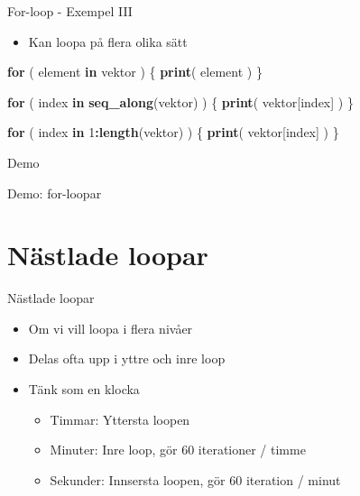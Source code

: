 \documentclass[
  11pt,
  ignorenonframetext,
]{beamer}
\newenvironment{Shaded}{\begin{snugshade}}{\end{snugshade}}
\newcommand{\ControlFlowTok}[1]{\textcolor[rgb]{0.13,0.29,0.53}{\textbf{#1}}}
\newcommand{\DecValTok}[1]{\textcolor[rgb]{0.00,0.00,0.81}{#1}}
\newcommand{\FunctionTok}[1]{\textcolor[rgb]{0.13,0.29,0.53}{\textbf{#1}}}
\newcommand{\NormalTok}[1]{#1}
\newcommand{\SpecialCharTok}[1]{\textcolor[rgb]{0.81,0.36,0.00}{\textbf{#1}}}
\providecommand{\tightlist}{%
  \setlength{\itemsep}{0pt}\setlength{\parskip}{0pt}}
\begin{document}
\begin{frame}[fragile]{For-loop - Exempel III}
\label{for-loop---exempel-iii}
\begin{itemize}
\tightlist
\item
  Kan loopa på flera olika sätt
\end{itemize}

\begin{Shaded}
\begin{Highlighting}[]
\ControlFlowTok{for}\NormalTok{ ( element }\ControlFlowTok{in}\NormalTok{ vektor ) \{}
  \FunctionTok{print}\NormalTok{( element )}
\NormalTok{\}}
\end{Highlighting}
\end{Shaded}

\begin{Shaded}
\begin{Highlighting}[]
\ControlFlowTok{for}\NormalTok{ ( index }\ControlFlowTok{in} \FunctionTok{seq\_along}\NormalTok{(vektor) ) \{}
  \FunctionTok{print}\NormalTok{( vektor[index] )}
\NormalTok{\}}
\end{Highlighting}
\end{Shaded}

\begin{Shaded}
\begin{Highlighting}[]
\ControlFlowTok{for}\NormalTok{ ( index }\ControlFlowTok{in} \DecValTok{1}\SpecialCharTok{:}\FunctionTok{length}\NormalTok{(vektor) ) \{}
  \FunctionTok{print}\NormalTok{( vektor[index] )}
\NormalTok{\}}
\end{Highlighting}
\end{Shaded}
\end{frame}

\begin{frame}{Demo}
\label{demo-1}
\begin{block}{Demo: for-loopar}
\label{demo-for-loopar}
\end{block}
\end{frame}

\section{Nästlade loopar}\label{nuxe4stlade-loopar}

\begin{frame}{Nästlade loopar}
\label{nuxe4stlade-loopar-1}
\begin{itemize}
\tightlist
\item
  Om vi vill loopa i flera nivåer
\item
  Delas ofta upp i yttre och inre loop
\item
  Tänk som en klocka

  \begin{itemize}
  \tightlist
  \item
    Timmar: Yttersta loopen
  \item
    Minuter: Inre loop, gör 60 iterationer / timme
  \item
    Sekunder: Innsersta loopen, gör 60 iteration / minut
  \end{itemize}
\end{itemize}
\end{frame}
\end{document}
